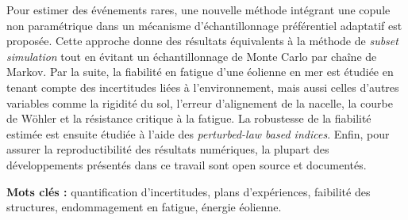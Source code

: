 {Pour estimer des événements rares, une nouvelle méthode intégrant une copule non paramétrique dans un mécanisme d'échantillonnage préférentiel adaptatif est proposée. 
Cette approche donne des résultats équivalents à la méthode de \textit{subset simulation} tout en évitant un échantillonnage de Monte Carlo par chaîne de Markov. 
Par la suite, la fiabilité en fatigue d'une éolienne en mer est étudiée en tenant compte des incertitudes liées à l'environnement, mais aussi celles d'autres variables comme la rigidité du sol, l'erreur d'alignement de la nacelle, la courbe de W\"{o}hler et la résistance critique à la fatigue. 
La robustesse de la fiabilité estimée est ensuite étudiée à l'aide des \textit{perturbed-law based indices}. 
Enfin, pour assurer la reproductibilité des résultats numériques, la plupart des développements présentés dans ce travail sont open source et documentés.

\vspace*{1cm}
\noindent
\textbf{Mots clés :} quantification d'incertitudes, plans d'expériences, faibilité des structures, endommagement en fatigue, énergie éolienne.
}